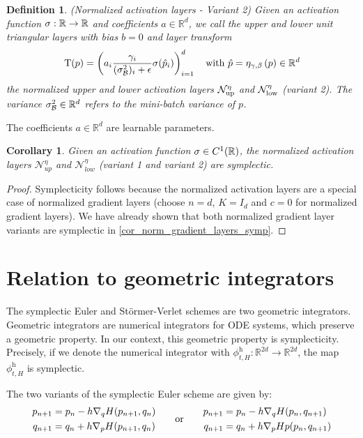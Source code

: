 \documentclass[twoside,a4paper]{article}
\newtheorem{definition}{Definition}
\newtheorem{corollary}{Corollary}
\begin{document}
\begin{definition}\label{def_norm_activation_layer_2}
	(Normalized activation layers - Variant 2)
	Given an activation function $\activation : \R \to \R$ and coefficients $a \in \mathbb{R}^d$, 
	we call the upper and lower unit triangular layers with bias $b=0$ and layer transform
	\begin{equation*}
		\layertf(p) = \lb a_i \frac{\gamma_i}{(\sigma^2_\mathcal{B})_i + \epsilon} 
		\activation(\hat{p}_i) \rb_{i=1}^d
		\quad \text{with } \hat{p} = \eta_{\gamma, \beta} \lb p \rb \in \R^d
	\end{equation*}
	the normalized upper and lower activation layers $\mathcal{N}_\up^\eta$ and $\mathcal{N}_\low^\eta$
	(variant 2).
	The variance $\sigma^2_\mathcal{B} \in \R^d$ refers to the mini-batch variance of $p$.
\end{definition}

The coefficients $a \in \mathbb{R}^d$ are learnable parameters.

\begin{corollary}
	Given an activation function $\sigma \in C^1(\R)$,
	the normalized activation layers $\mathcal{N}^{\eta}_{up}$ and $\mathcal{N}^{\eta}_{low}$
	(variant 1 and variant 2) are symplectic.
\end{corollary}
\begin{proof}
	Symplecticity follows because the normalized activation layers are a special case
	of normalized gradient layers (choose $n=d$, $K=I_d$ and $c=0$ for normalized gradient layers). 
	We have already shown that both normalized gradient layer variants are symplectic in
	\cref{cor_norm_gradient_layers_symp}.
\end{proof}

\section{Relation to geometric integrators}\label{sec_relation_to_geometric_integrators}

The symplectic Euler and Störmer-Verlet schemes are two geometric integrators. Geometric integrators
are numerical integrators for ODE systems, which preserve a geometric property. In our context,
this geometric property is symplecticity. Precisely, if we denote the numerical integrator with
$\phi^{\text{h}}_{t,H} : \mathbb{R}^{2d} \to \mathbb{R}^{2d}$, the map $\phi^{\text{h}}_{t,H}$ is
symplectic.

The two variants of the symplectic Euler scheme are given by:
\begin{equation*}
	\begin{split}
			p_{n+1} &= p_n - h \grad[q]{H} (p_{n+1}, q_n) \\
			q_{n+1} &= q_n + h \grad[p]{H}(p_{n+1}, q_n)	
	\end{split}
	\quad\quad \text{or} \quad\quad
	\begin{split}
			p_{n+1} &= p_n - h \grad[q]{H}(p_n, q_{n+1}) \\
			q_{n+1} &= q_n + h \grad[p]{H}{p}(p_n, q_{n+1})	
	\end{split}
\end{equation*}
\end{document}
